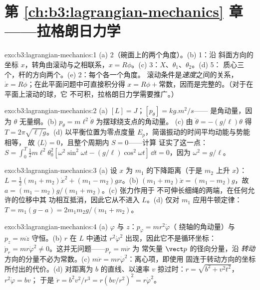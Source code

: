 \section*{第 \ref{ch:b3:lagrangian-mechanics} 章——拉格朗日力学}

\begin{solution}{exo:b3:lagrangian-mechanics:1}
(a) 2（碗面上的两个角度）。(b) 1：沿
斜面方向的坐标 $x$，转角由滚动与之相联系，$x =
R\phi$。(c) 3：$X$、$\theta_1$、$\theta_2$。(d) 5：
质心三个，杆的方向两个。(e) 2：每个各一个角度。
滚动条件是\emph{速度}之间的关系，$\dot x =
R\dot\phi$；在此平面问题中可直接积分得 $x = R\phi +
\text{常数}$，因而是完整的。（对于在平面上滚动的球，它
不可积，拉格朗日力学需要推广。）
\end{solution}

\begin{solution}{exo:b3:lagrangian-mechanics:2}
(a) $[L] = \unit{J}$；$[p_\theta] = \unit{kg.m^2/s}$——
是角动量，因为 $\theta$ 无量纲。(b) $p_\theta =
m\ell^2\dot\theta$ 为摆球绕支点的角动量。
(c) 由 $\ddot\theta = -(g/\ell)\theta$ 得 $T = 2\pi\sqrt{\ell/g}$。(d)
以平衡位置为零点度量 $E_p$，简谐振动的时间平均动能与势能相等，
故 $\langle
L\rangle = 0$，且整个周期内 $S = 0$——计算
证实了这一点：$S = \int_0^T\tfrac12 m\ell^2\theta_0^2[\omega^2\sin^2
\omega t - (g/\ell)\cos^2\omega t]\,\dd t = 0$，因为 $\omega^2 =
g/\ell$。
\end{solution}

\begin{solution}{exo:b3:lagrangian-mechanics:3}
(a) 设 $x$ 为 $m_1$ 的下降距离（于是 $m_2$ 上升 $x$）：$L =
\tfrac12(m_1 + m_2)\dot x^2 + (m_1 - m_2)gx$。(b) $(m_1 + m_2)\ddot x =
(m_1 - m_2)g$，故 $a = (m_1 - m_2)g/(m_1 + m_2)$。(c) 张力作用于
不可伸长细绳的两端，在任何允许的位移中其
功相互抵消，因此它从不进入 $L$。(d) 仅对 $m_1$ 应用牛顿定律：$T =
m_1(g - a) = 2m_1m_2g/(m_1 + m_2)$。
\end{solution}

\begin{solution}{exo:b3:lagrangian-mechanics:4}
(a) $\varphi$ 与 $z$：$p_\varphi = mr^2\dot\varphi$（
绕轴的角动量）与 $p_z = m\dot z$ 守恒。(b) $r$
在 $L$ 中通过 $r^2\dot\varphi^2$ 出现，因此它不是循环坐标：$\dot p_r =
mr\dot\varphi^2 \neq 0$。这并无问题——$p_r = m\dot r$ 为
常矢量 $\vect p$ 的径向分量，沿
\emph{转动}方向的分量不必为常数。(c) $m\ddot r =
mr\dot\varphi^2$：离心项，即使用
固连于转动方向的坐标所付出的代价。(d) 对距离为 $b$
的直线、以速率 $v$ 掠过时：$r = \sqrt{b^2 + v^2t^2}$，$r^2\dot\varphi = bv$；
于是 $\ddot r = b^2v^2/r^3 = r(bv/r^2)^2 = r\dot\varphi^2$。
\end{solution}

